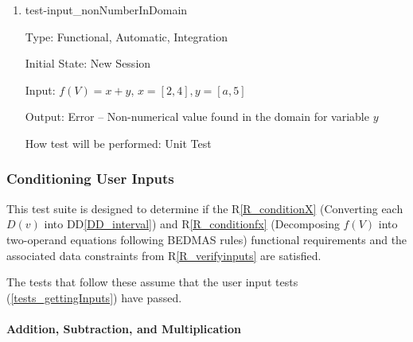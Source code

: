 \documentclass[12pt, titlepage]{article}
\newcommand{\rref}[1]{R\ref{#1}}
\newcommand{\ddref}[1]{DD\ref{#1}}
\begin{document}
\begin{enumerate}
	
	\item{test-input\_nonNumberInDomain}
	
	Type: Functional, Automatic, Integration
	
	Initial State: New Session
	
	Input: $f(V) = x + y$, $x = [2,4], y = [a,5]$
	
	Output: Error -- Non-numerical value found in the domain for variable $y$
	
	How test will be performed: Unit Test\\
	
\end{enumerate}

\subsubsection{Conditioning User Inputs}
\label{tests_conditioningInputs}
This test suite is designed to determine if the \rref{R_conditionX} (Converting 
each $D(v)$ into \ddref{DD_interval}) and \rref{R_conditionfx} (Decomposing 
$f(V)$ into two-operand equations following BEDMAS rules) functional 
requirements and the associated data constraints from \rref{R_verifyinputs} are 
satisfied.

The tests that follow these assume that the user input tests 
(\ref{tests_gettingInputs}) have passed.

\paragraph{Addition, Subtraction, and Multiplication}
\end{document}
